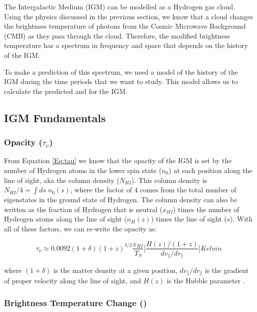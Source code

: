 The Intergalactic Medium (IGM) can be modelled as a Hydrogen gas cloud. Using the physics discussed in the previous section, we know that a cloud changes the brightness temperature of photons from the Cosmic Microwave Background (CMB) as they pass through the cloud. Therefore, the modified brightness temperature has a spectrum in frequency and space that depends on the history of the IGM. 

To make a prediction of this spectrum, we need a model of the history of the IGM during the time periods that we want to study. This model allows us to calculate the predicted \ts and \tu for the IGM. 


\subsection{IGM Fundamentals}

\subsubsection{Opacity ($\tau_\nu$)}

From Equation \ref{Eq:tau} we know that the opacity of the IGM is set by the number of Hydrogen atoms in the lower spin state ($n_0$) at each position along the line of sight, aka the column density ($N_{HI}$). This column density is $N_{HI}/4 = \int ds  \; n_0 (s)$, where the factor of 4 comes from the total number of eigenstates in the ground state of Hydrogen. The column density can also be written as the fraction of Hydrogen that is neutral ($x_{HI}$) times the number of Hydrogen atoms along the line of sight ($n_H (z)$) times the line of sight ($s$). With all of these factors, we can re-write the opacity as:

\begin{equation}
\tau_{\nu} \approx 0.0092 (1+\delta) (1+z)^{3/2} \frac{x_{HI}}{T_S} \Big[ \frac{H(z)/(1+z)}{dv_{\parallel}/dr_{\parallel}} \Big] Kelvin
\end{equation} 

where $(1+\delta)$ is the matter density at a given position, $dv_{\parallel}/dr_{\parallel}$ is the gradient of proper velocity along the line of sight, and $H(z)$ is the Hubble parameter \cite{furlanetto_2006}. 

\subsubsection{Brightness Temperature Change (\dtb)}

